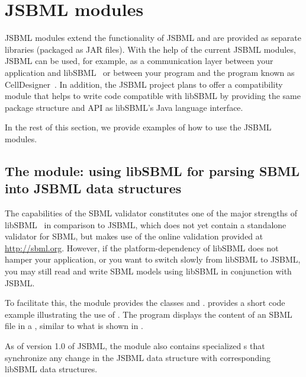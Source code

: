 
\section{JSBML modules}
\label{sec:jsbml-modules-details}

JSBML modules extend the functionality of JSBML and are provided as
separate libraries (packaged as JAR files). With the help of the current
JSBML modules, JSBML can be used, for example, as a communication layer
 between your application and
libSBML~\citep{Bornstein2008} or between your program and the program known
as CellDesigner~\citep{Funahashi2003}. In addition, the JSBML project plans to offer a
compatibility module %
that helps to write code compatible with libSBML by providing the same package 
structure and API as libSBML's Java
language interface.

In the rest of this section, we provide examples of how to use the JSBML
modules.


\subsection{The  module: using libSBML for parsing
  SBML into JSBML data structures}

The capabilities of the SBML validator constitutes one
of the major strengths of libSBML~\citep{Bornstein2008} in comparison to
JSBML, which does not yet contain a standalone validator for SBML, but makes
use of the online validation provided at \url{http://sbml.org}. However, if
the platform-dependency of libSBML does not hamper your application, or you
want to switch slowly from libSBML to JSBML, you may still read and write
SBML models using libSBML in conjunction with JSBML.

To facilitate this, the module  provides the classes
\LibSBMLReader and \LibSBMLWriter.   provides a short
code example illustrating the use of \LibSBMLReader.  The program displays the
content of an SBML file in a \JTree, similar to what is shown in
.

As of version 1.0 of JSBML, the  module also contains
specialized \TreeNodeChangeListener{}s that synchronize any change in the
JSBML data structure with corresponding libSBML data structures.

